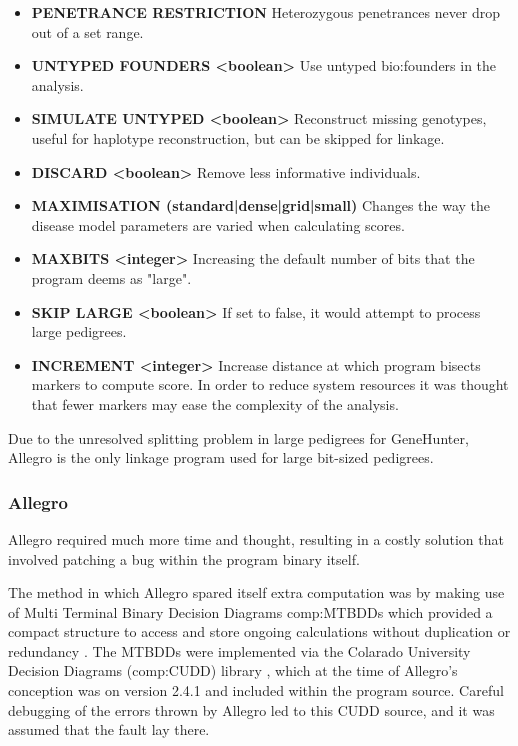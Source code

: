 \begin{itemize}
\item{{\bf\footnotesize PENETRANCE RESTRICTION} Heterozygous penetrances never drop out of a set range.}
\item{{\bf\footnotesize UNTYPED FOUNDERS <boolean>} Use untyped \gls{bio:founders} in the analysis.}
\item{{\bf\footnotesize SIMULATE UNTYPED <boolean>} Reconstruct missing genotypes, useful for haplotype reconstruction, but can be skipped for linkage.}
\item{{\bf\footnotesize DISCARD <boolean>} Remove less informative individuals.}
\item{{\bf\footnotesize MAXIMISATION (standard|dense|grid|small)} Changes the way the disease model parameters are varied when calculating scores.}
\item{{\bf\footnotesize MAXBITS <integer>} Increasing the default number of bits that the program deems as "large".}
\item{{\bf\footnotesize SKIP LARGE <boolean>} If set to false, it would attempt to process large pedigrees.}
\item{{\bf\footnotesize INCREMENT <integer>} Increase distance at which program bisects markers to compute score. In order to reduce system resources it was thought that fewer markers may ease the complexity of the analysis.}
\end{itemize}

Due to the unresolved splitting problem in large pedigrees for GeneHunter, Allegro is the only linkage program used for large bit-sized pedigrees.


\subsubsection{Allegro}\label{ref:meth:allegrobigdata}

Allegro required much more time and thought, resulting in a costly solution that involved patching a bug within the program binary itself.

The method in which Allegro spared itself extra computation was by making use of Multi Terminal Binary Decision Diagrams \gls{comp:MTBDD}s which provided a compact structure to access and store ongoing calculations without duplication or redundancy \cite{mtbdd}. The MTBDDs were implemented via the Colarado University Decision Diagrams (\gls{comp:CUDD}) library \citep{cudd}, which at the time of Allegro's conception was on version 2.4.1 and included within the program source. Careful debugging of the errors thrown by Allegro led to this CUDD source, and it was assumed that the fault lay there.

